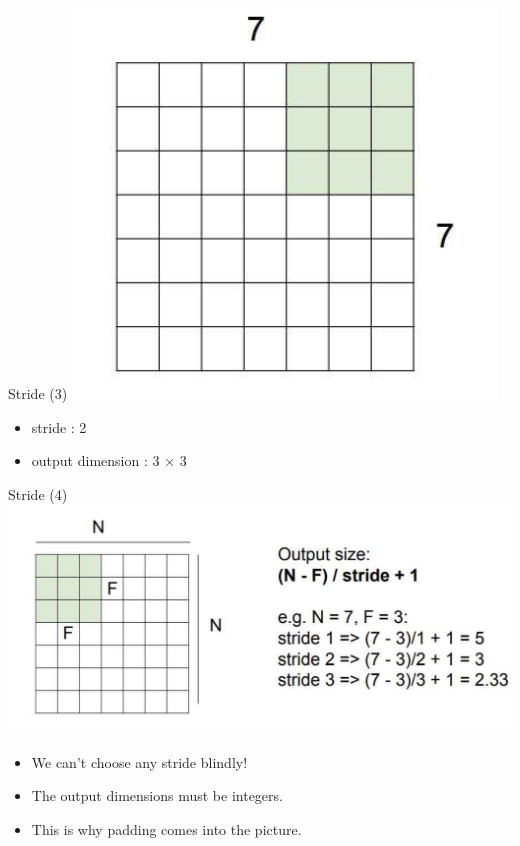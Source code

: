 \documentclass[default, aspectratio=169]{beamer}
\begin{document}
\begin{frame}{Stride (3)}
		\includegraphics[keepaspectratio, scale=0.5]{pic/stride23.png}
		
		\smallskip	
		\begin{itemize}
			\item stride : 2
			\item output dimension : 3 $\times$ 3
		\end{itemize}
	\end{frame}
	\begin{frame}{Stride (4)}
		\centering
		\includegraphics[keepaspectratio, scale=0.5]{pic/strideComp.png}
		\smallskip		
		\begin{itemize}
			\item We can't choose any stride blindly!
			\item The output dimensions must be integers.
			\item This is why padding comes into the picture.
		\end{itemize}
		
	\end{frame}
\end{document}
